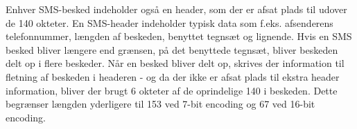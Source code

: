 Enhver SMS-besked indeholder også en header\cite{sms_pdu}, som der er afsat plads til udover de 140 okteter. En SMS-header indeholder typisk data som f.eks. afsenderens telefonnummer, længden af beskeden, benyttet tegnsæt og lignende. Hvis en SMS besked bliver længere end grænsen, på det benyttede tegnsæt, bliver beskeden delt op i flere beskeder. Når en besked bliver delt op, skrives der information til fletning af beskeden i headeren - og da der ikke er afsat plads til ekstra header information, bliver der brugt 6 okteter af de oprindelige 140 i beskeden. Dette begrænser længden yderligere til 153 ved 7-bit encoding og 67 ved 16-bit encoding. 
